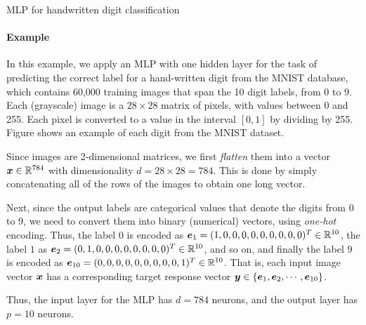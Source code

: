 %
%
\begin{frame}{MLP for handwritten digit classification}
\framesubtitle{Example}
\small
    In this example, we apply an MLP with one hidden layer for the 
    task of predicting the correct label for a hand-written digit
    from the MNIST database, which contains 60,000 training images that
    span the 10 digit labels, from $0$ to $9$. 
    Each (grayscale)
    image is a $28\times28$
    matrix of pixels, with values between 0 and 255. Each pixel is
    converted to a value in the interval $[0,1]$ by dividing by 255.
Figure shows an example of each digit from
    the MNIST dataset.

\medskip

    
    Since images are 2-dimensional matrices, we first {\em
    flatten} them into a vector ${\boldsymbol x} \in {\mathord{\mathbb R}}^{784}$ with
    dimensionality $d= 28\times 28=784 $. This is done by simply
    concatenating all of the rows of the images to obtain one long
    vector. 

\medskip

Next, since the output labels are categorical values that
    denote the digits from $0$ to $9$, we need to convert them into
    binary (numerical) vectors, using {\em one-hot} encoding. Thus, the
    label $0$ is encoded as ${\boldsymbol e}_1 = (1,0,0,0,0,0,0,0,0,0)^T \in
    {\mathord{\mathbb R}}^{10}$, the label $1$ as ${\boldsymbol e}_2 =(0,1,0,0,0,0,0,0,0,0)^T \in
    {\mathord{\mathbb R}}^{10}$, and so on, and finally the label $9$ is encoded as 
    ${\boldsymbol e}_{10} = (0,0,0,0,0,0,0,0,0,1)^T \in
    {\mathord{\mathbb R}}^{10}$. That is, each input image vector ${\boldsymbol x}$ has a
    corresponding target response vector ${\boldsymbol y} \in \{{\boldsymbol e}_1, {\boldsymbol e}_2,
    \cdots, {\boldsymbol e}_{10}\}$. 

\medskip

Thus, the input layer for the MLP has $d=784$
    neurons, and the output layer has $p=10$ neurons.
\end{frame}

